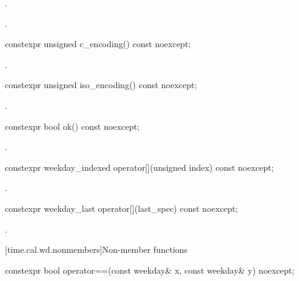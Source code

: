 \begin{itemdescr}
\pnum
\effects
{}.

\pnum
\returns
{}.
\end{itemdescr}

%
\begin{itemdecl}
constexpr unsigned c_encoding() const noexcept;
\end{itemdecl}

\begin{itemdescr}
\pnum
\returns
{}.
\end{itemdescr}

%
\begin{itemdecl}
constexpr unsigned iso_encoding() const noexcept;
\end{itemdecl}

\begin{itemdescr}
\pnum
\returns
{}.
\end{itemdescr}

%
\begin{itemdecl}
constexpr bool ok() const noexcept;
\end{itemdecl}

\begin{itemdescr}
\pnum
\returns
{}.
\end{itemdescr}

%
\begin{itemdecl}
constexpr weekday_indexed operator[](unsigned index) const noexcept;
\end{itemdecl}

\begin{itemdescr}
\pnum
\returns
{}.
\end{itemdescr}

%
\begin{itemdecl}
constexpr weekday_last operator[](last_spec) const noexcept;
\end{itemdecl}

\begin{itemdescr}
\pnum
\returns
{}.
\end{itemdescr}

[time.cal.wd.nonmembers]{Non-member functions}

%
\begin{itemdecl}
constexpr bool operator==(const weekday& x, const weekday& y) noexcept;
\end{itemdecl}

